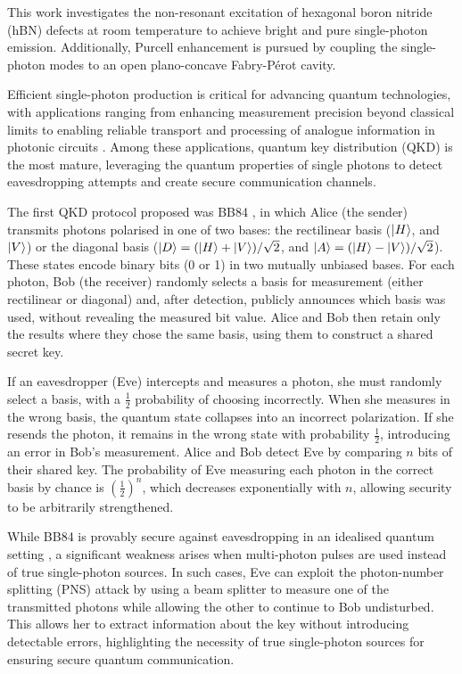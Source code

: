 This work investigates the non-resonant excitation of hexagonal boron nitride (hBN) defects at room temperature to achieve bright and pure single-photon emission. Additionally, Purcell enhancement is pursued by coupling the single-photon modes to an open plano-concave Fabry-Pérot cavity.

Efficient single-photon production is critical for advancing quantum technologies, with applications ranging from enhancing measurement precision beyond classical limits \cite{Nagata2007, Vitelli2010} to enabling reliable transport and processing of analogue information in photonic circuits \cite{Bogaerts2020}. Among these applications, quantum key distribution (QKD) is the most mature, leveraging the quantum properties of single photons to detect eavesdropping attempts and create secure communication channels. 

The first QKD protocol proposed was BB84 \cite{Bennett2014}, in which Alice (the sender) transmits photons polarised in one of two bases: the rectilinear basis ($\ket{H}$, and $\ket{V}$) or the diagonal basis ($\ket{D}=(\ket{H}+\ket{V})/\sqrt{2}$, and $\ket{A}=(\ket{H}-\ket{V})/\sqrt{2}$). These states encode binary bits (0 or 1) in two mutually unbiased bases. For each photon, Bob (the receiver) randomly selects a basis for measurement (either rectilinear or diagonal) and, after detection, publicly announces which basis was used, without revealing the measured bit value. Alice and Bob then retain only the results where they chose the same basis, using them to construct a shared secret key.

If an eavesdropper (Eve) intercepts and measures a photon, she must randomly select a basis, with a $ \frac{1}{2} $ probability of choosing incorrectly. When she measures in the wrong basis, the quantum state collapses into an incorrect polarization. If she resends the photon, it remains in the wrong state with probability $ \frac{1}{2} $, introducing an error in Bob’s measurement. Alice and Bob detect Eve by comparing $ n $ bits of their shared key. The probability of Eve measuring each photon in the correct basis by chance is $\left(\frac{1}{2}\right)^n$, which decreases exponentially with $n$, allowing security to be arbitrarily strengthened.

While BB84 is provably secure against eavesdropping in an idealised quantum setting \cite{Shor2000}, a significant weakness arises when multi-photon pulses are used instead of true single-photon sources. In such cases, Eve can exploit the photon-number splitting (PNS) attack by using a beam splitter to measure one of the transmitted photons while allowing the other to continue to Bob undisturbed. This allows her to extract information about the key without introducing detectable errors, highlighting the necessity of true single-photon sources for ensuring secure quantum communication.

